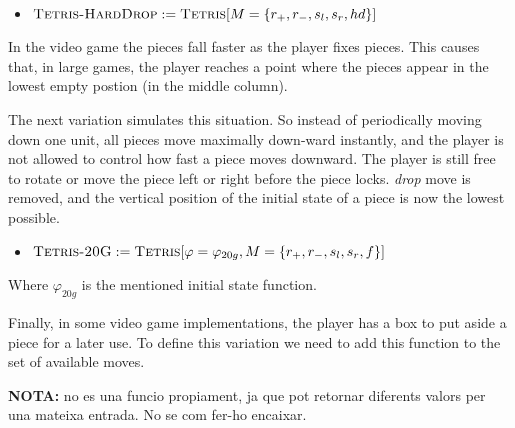\begin{itemize}
  \item $\textsc{Tetris-HardDrop} := \textsc{Tetris}[M = \{ r_+, r_-, s_l, s_r, hd \}]$
\end{itemize}

In the video game the pieces fall faster as the player fixes pieces. This causes that, in large games, the player reaches a point where the pieces appear in the lowest empty postion (in the middle column).

The next variation simulates this situation. So instead of periodically moving down one unit, all pieces move maximally down-ward instantly, and the player is not allowed to control how fast a piece moves downward. The player is still free to rotate or move the piece left or right before the piece locks. \emph{drop} move is removed, and the vertical position of the initial state of a piece is now the lowest possible.

\begin{itemize}
  \item $\textsc{Tetris-20G} := \textsc{Tetris}[\varphi = \varphi_{20g}, M = \{ r_+, r_-, s_l, s_r, f \}]$
\end{itemize}

Where $\varphi_{20g}$ is the mentioned initial state function. 

\vspace{10px}
Finally, in some video game implementations, the player has a box to put aside a piece for a later use. To define this variation we need to add this function to the set of available moves.

\textbf{NOTA:} no es una funcio propiament, ja que pot retornar diferents valors per una mateixa entrada. No se com fer-ho encaixar.

